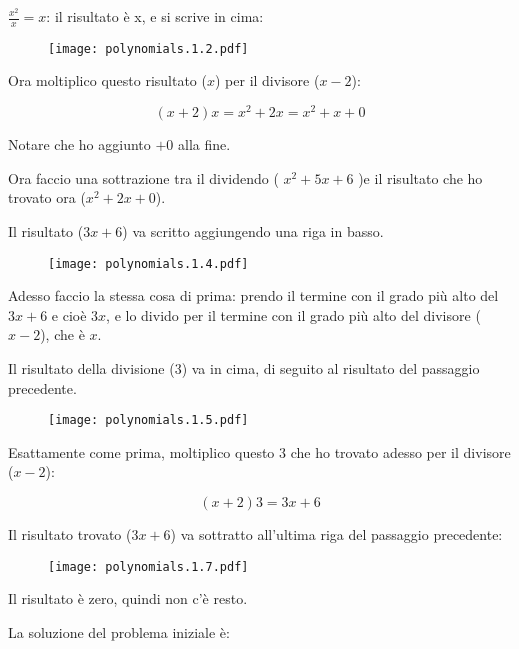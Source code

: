 $\frac{x^2}{x}=x$: il risultato è x, e si scrive in cima:

\begin{figure}[H]
\centering
\texttt{[image: polynomials.1.2.pdf]}
\end{figure}

Ora moltiplico questo risultato ($x$) per il divisore ($x-2$):

\begin{equation}
(x+2)x=x^2+2x = x^2+x+0
\end{equation}

Notare che ho aggiunto $+0$ alla fine.

Ora faccio una sottrazione tra il dividendo ( $x^2+5x+6$ )e il risultato che ho trovato ora ($x^2+2x+0$).

Il risultato ($3x+6$) va scritto aggiungendo una riga in basso.

\begin{figure}[H]
\centering
\texttt{[image: polynomials.1.4.pdf]}
\end{figure}

\begin{minipage}{\textwidth}
Adesso faccio la stessa cosa di prima: prendo il termine con il grado più alto del $3x+6$ e cioè $3x$, e lo divido per il termine con il grado più alto del divisore ($x-2$), che è $x$.

Il risultato della divisione ($3$) va in cima, di seguito al risultato del passaggio precedente.

\begin{figure}[H]
\centering
\texttt{[image: polynomials.1.5.pdf]}
\end{figure}
\end{minipage}

Esattamente come prima, moltiplico questo $3$ che ho trovato adesso per il divisore ($x-2$):

\begin{equation}
(x+2)3=3x+6
\end{equation}

Il risultato trovato ($3x+6$) va sottratto all'ultima riga del passaggio precedente:


\begin{figure}[H]
\centering
\texttt{[image: polynomials.1.7.pdf]}
\end{figure}

Il risultato è zero, quindi non c'è resto.

La soluzione del problema iniziale è:

